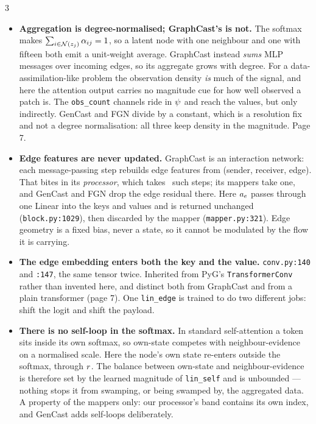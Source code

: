 \documentclass[11pt,landscape]{article}
\begin{document}
\begin{multicols}{3}
\footnotesize\sloppy  %
\begin{itemize}[leftmargin=1.1em]\setlength{\itemsep}{0.35em}

    \item \textbf{Aggregation is degree-normalised; GraphCast's is not.}
      The softmax makes $\sum_{i\in\mathcal{N}(z_j)}\alpha_{ij}=1$, so a latent
      node with one neighbour and one with fifteen both emit a unit-weight
      average.  GraphCast instead \emph{sums} MLP messages over incoming edges,
      so its aggregate grows with degree.  For a data-assimilation-like problem
      the observation density \emph{is} much of the signal, and here the
      attention output carries no magnitude cue for how well observed a patch
      is.  The \texttt{obs\_count} channels ride in $\psi$ and reach the
      values, but only indirectly.  GenCast and FGN divide by a constant, which is
      a resolution fix and not a degree normalisation: all three keep density in
      the magnitude.  Page 7.

    \item \textbf{Edge features are never updated.}
      GraphCast is an interaction network: each message-passing step rebuilds
      edge features from (sender, receiver, edge).  That bites in its
      \emph{processor}, which takes \gcsteps\ such steps; its mappers take one,
      and GenCast and FGN drop the edge residual there.  Here $a_{e}$ passes through
      one Linear into the keys and values and is returned unchanged
      (\texttt{block.py:1029}), then discarded by the mapper
      (\texttt{mapper.py:321}).  Edge geometry is a fixed bias, never a state, so
      it cannot be modulated by the flow it is carrying.

    \item \textbf{The edge embedding enters both the key and the value.}
      \texttt{conv.py:140} and \texttt{:147}, the same tensor twice.  Inherited
      from PyG's \texttt{TransformerConv} rather than invented here, and distinct
      both from GraphCast and from a plain transformer (page 7).  One
      \texttt{lin\_edge} is trained to do two different jobs: shift the logit and
      shift the payload.

    \item \textbf{There is no self-loop in the softmax.}
      In standard self-attention a token sits inside its own softmax, so
      own-state competes with neighbour-evidence on a normalised scale.  Here the
      node's own state re-enters outside the softmax,
      through $r$.  The balance between own-state and neighbour-evidence is
      therefore set by the learned magnitude of \texttt{lin\_self} and is
      unbounded --- nothing stops it from swamping, or being swamped by, the
      aggregated data.  A property of the mappers only: our processor's band
      contains its own index, and GenCast adds self-loops deliberately.


\end{itemize}
\end{multicols}
\end{document}
